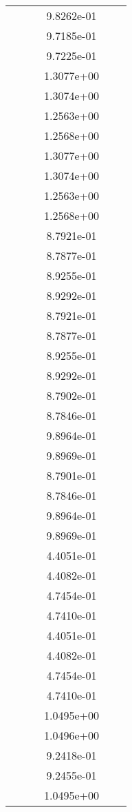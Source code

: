 \begin{xltabular}{\textwidth}{r|rS[table-format=1.3e+2]S[table-format=1.4e+2]S[table-format=1.4e+2]S[table-format=-1.5]}
&  &  & 9.8262e-01 & & \\
&  &  & 9.7185e-01 & & \\
&  &  & 9.7225e-01 & & \\
&  &  & 1.3077e+00 & & \\
&  &  & 1.3074e+00 & & \\
&  &  & 1.2563e+00 & & \\
&  &  & 1.2568e+00 & & \\
&  &  & 1.3077e+00 & & \\
&  &  & 1.3074e+00 & & \\
&  &  & 1.2563e+00 & & \\
&  &  & 1.2568e+00 & & \\
&  &  & 8.7921e-01 & & \\
&  &  & 8.7877e-01 & & \\
&  &  & 8.9255e-01 & & \\
&  &  & 8.9292e-01 & & \\
&  &  & 8.7921e-01 & & \\
&  &  & 8.7877e-01 & & \\
&  &  & 8.9255e-01 & & \\
&  &  & 8.9292e-01 & & \\
&  &  & 8.7902e-01 & & \\
&  &  & 8.7846e-01 & & \\
&  &  & 9.8964e-01 & & \\
&  &  & 9.8969e-01 & & \\
&  &  & 8.7901e-01 & & \\
&  &  & 8.7846e-01 & & \\
&  &  & 9.8964e-01 & & \\
&  &  & 9.8969e-01 & & \\
&  &  & 4.4051e-01 & & \\
&  &  & 4.4082e-01 & & \\
&  &  & 4.7454e-01 & & \\
&  &  & 4.7410e-01 & & \\
&  &  & 4.4051e-01 & & \\
&  &  & 4.4082e-01 & & \\
&  &  & 4.7454e-01 & & \\
&  &  & 4.7410e-01 & & \\
&  &  & 1.0495e+00 & & \\
&  &  & 1.0496e+00 & & \\
&  &  & 9.2418e-01 & & \\
&  &  & 9.2455e-01 & & \\
&  &  & 1.0495e+00 & & \\

\end{xltabular}
